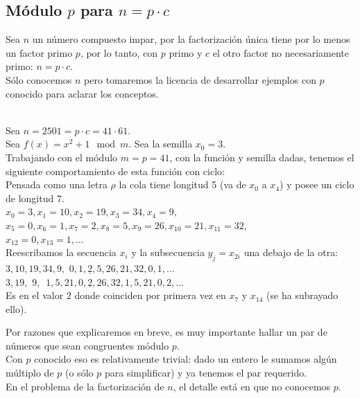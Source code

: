 \subsection{Módulo $p$ para $n=p \cdot c$}
Sea $n$ un número compuesto impar, por la factorización única tiene por lo menos un factor primo $p$, por lo tanto, con $p$ primo y $c$ el otro factor no necesariamente primo: $n=p \cdot c$. \\

Sólo conocemos $n$ pero tomaremos la licencia de desarrollar ejemplos con $p$ conocido para aclarar los conceptos.

\begin{ejemplo} \, \\
Sea $n=2501=p \cdot c=41 \cdot 61$. \\
Sea $f(x) = x^2 + 1 \mod m$. Sea la semilla $x_0 = 3 $. \\
Trabajando con el módulo $m=p=41$, con la función y semilla dadas, tenemos el siguiente comportamiento de esta función con ciclo: \\
Pensada como una letra $\rho$ la cola tiene longitud 5  (va de $x_0$ a $x_4$) y posee un ciclo de longitud 7. \\
$x_0 = 3, x_1 = 10, x_2 = 19, x_3 = 34, x_4 = 9,$ \\
$ x_5 = 0, x_6 = 1, x_7 = 2, x_8 = 5, x_9 = 26, x_{10} = 21, x_{11} = 32,$ \\
$ x_{12} = 0, x_{13} = 1, \dots$ \\
Reescribamos la secuencia $x_i$ y la subsecuencia $y_j=x_{2i}$ una debajo de la otra: \\
$3, 10, 19, 34, 9, \,\,0, 1, \underline{2}, 5, 26, 21, 32, 0, 1, \dots$ \\
$3, 19, \,\,9, \,\,\,1, 5, 21, 0, \underline{2}, 26, 32, 1, 5, 21, 0, 2, \dots$ \\
Es en el valor $2$ donde coinciden por primera vez en $x_{7}$ y $x_{14}$ (se ha subrayado ello). 
\end{ejemplo}

Por razones que explicaremos en breve, es muy importante hallar un par de números que sean congruentes módulo $p$. \\
Con $p$ conocido eso es relativamente trivial: dado un entero le sumamos algún múltiplo de $p$ (o sólo $p$ para simplificar) y ya tenemos el par requerido. \\
En el problema de la factorización de $n$, el detalle está en que no conocemos $p$. \\

